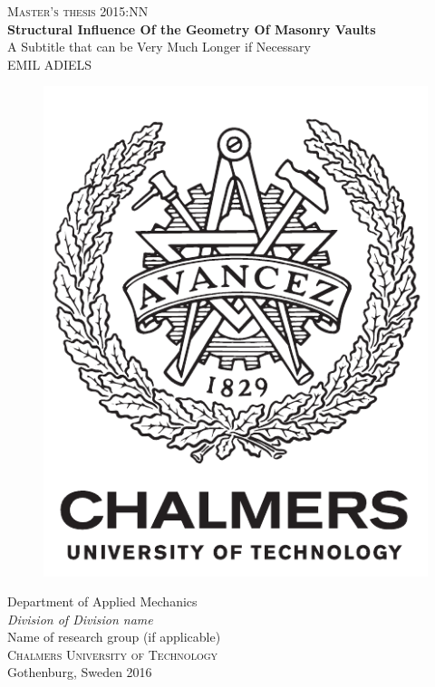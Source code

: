 \newpage
\restoregeometry
\thispagestyle{empty}
\mbox{}


\newpage
\thispagestyle{empty}
\begin{center}
	\textsc{\large Master's thesis 2015:NN}\\[4cm]		%
	\textbf{\Large Structural Influence Of the Geometry Of Masonry Vaults} \\[1cm]
	{\large A Subtitle that can be Very Much Longer if Necessary}\\[1cm]
	{\large EMIL ADIELS}
	
	\vfill	
	\begin{figure}[H]
	\centering
	\includegraphics[width=0.2\pdfpagewidth]{figure/auxiliary/logo_eng.pdf} \\	
	\end{figure}	\vspace{5mm}	
	
	Department of Applied Mechanics \\
	\emph{Division of Division name}\\
	Name of research group (if applicable)\\
	\textsc{Chalmers University of Technology} \\
	Gothenburg, Sweden 2016 \\
\end{center}


